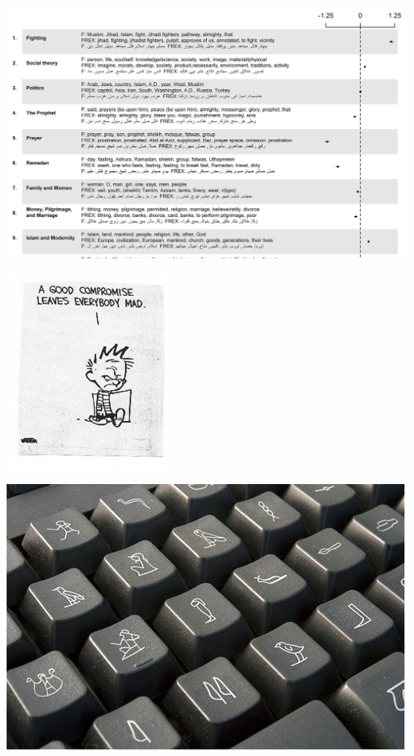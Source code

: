 \documentclass[11pt,compress,professionalfonts]{beamer}
\begin{document}

\centerline{\includegraphics[scale=.8]{pictures/stm-clerics}}


\centerline{\includegraphics[scale=1.5]{pictures/compromise.png}}

\slide{}


\centerline{\includegraphics[scale=.8]{pictures/hieroglyphic-keyboard-cm}}
\end{document}
